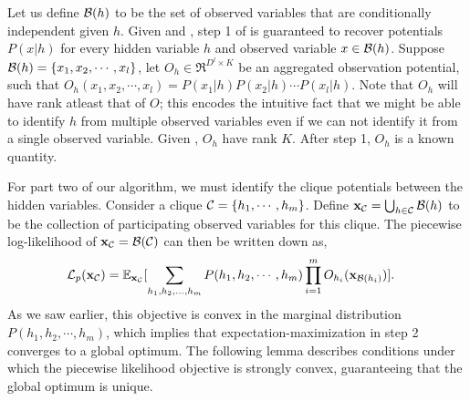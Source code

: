 Let us define $\mathcal{B}(h)$ to be the set of observed variables that
  are conditionally independent given $h$. 
Given  and , step
  1 of  is guaranteed to recover potentials
  $P(x|h)$ for every hidden variable $h$ and observed variable $x \in
  \mathcal{B}(h)$.
Suppose $\mathcal{B}(h) = \{x_1, x_2, \cdots, x_l\}$, let $O_h \in
  \Re^{D^l \times K}$ be an
  aggregated observation potential, such that $O_h(x_1, x_2, \cdots,
  x_l) = P(x_1|h) P(x_2|h) \cdots P(x_l|h)$.
Note that $O_h$ will have rank atleast that of $O$; this encodes the
  intuitive fact that we might be able to identify $h$ from multiple
  observed variables even if we can not identify it from a single
  observed variable. 
Given , $O_h$ have rank $K$.
After step 1, $O_h$ is a known quantity.

For part two of our algorithm, we must identify the clique potentials between the
  hidden variables. 
Consider a clique $\mathcal{C} = \{h_1, \cdots, h_m\}$. 
Define $\mathbf{x}_{\mathcal{C}} = \bigcup_{h \in \mathcal{C}} \mathcal{B}(h)$ to be the collection of
  participating observed variables for this clique.
The piecewise log-likelihood of $\mathbf{x}_{\mathcal{C}} =\mathcal{B}(\mathcal{C})$ can then be
  written down as,
\begin{align}
  \mathcal{L}_p(\mathbf{x}_{\mathcal{C}}) 
    &= \mathbb{E}_{\mathbf{x}_{\mathcal{C}}}[ \sum_{h_1, h_2, \ldots, h_m} P(h_1, h_2, \cdots, h_m) 
    \prod_{i=1}^{m} O_{h_i}(\mathbf{x}_{\mathcal{B}(h_i)}) ]. \label{eqn:piecewise}
\end{align}
As we saw earlier, this objective is convex in the marginal distribution
  $P(h_1, h_2, \cdots, h_m)$, which implies that
  expectation-maximization in step 2 converges to a global optimum.
The following lemma describes conditions under which the piecewise
  likelihood objective is strongly convex, guaranteeing that the global
  optimum is unique.

